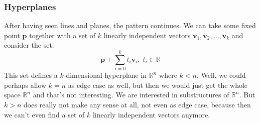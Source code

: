 \subsubsection{Hyperplanes}
After having seen lines and planes, the pattern continues. We can take some fixed point $\mathbf{p}$ together with a set of $k$ linearly independent vectors $\mathbf{v}_1, \mathbf{v}_2, \ldots, \mathbf{v}_k$ and consider the set:
\begin{equation}
 \mathbf{p} + \sum_{i=0}^{k} t_i \mathbf{v}_i, \; t_i \in \mathbb{R}
\end{equation}
This set defines a $k$-dimensional hyperplane in $\mathbb{R}^n$ where $k < n$. Well, we could perhaps allow $k=n$ as edge case as well, but then we would just get the whole space $\mathbb{R}^n$ and that's not interesting. We are interested in substructures of $\mathbb{R}^n$. But $k > n$ does really not make any sense at all, not even as edge case, because then we can't even find a set of $k$ linearly independent vectors anymore.












\begin{comment}


Geometrische Interpretation linearer Abbildungen
https://www.youtube.com/watch?v=EQ5Xct2YyLk


Weitz: Analytische Geometrie
https://www.youtube.com/watch?v=7rkkHIjHtNI
https://www.youtube.com/watch?v=7rkkHIjHtNI&list=PLb0zKSynM2PBYzz6l37rWH3B_n_7P40QP

\end{comment}
